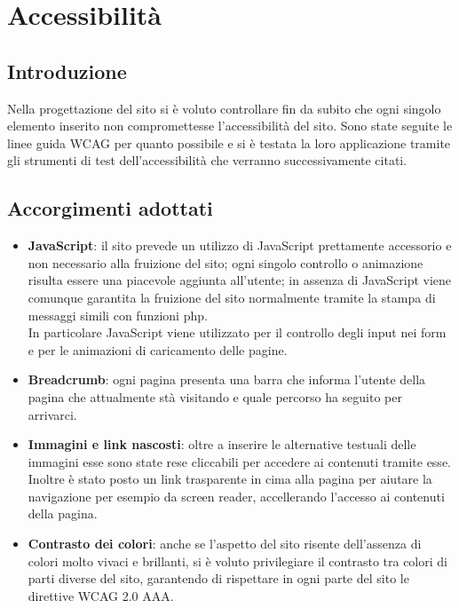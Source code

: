 \documentclass[a4paper,12pt]{article}
\begin{document}
\section{Accessibilità}
\subsection{Introduzione}
Nella progettazione del sito si è voluto controllare fin da subito che ogni singolo elemento inserito non compromettesse l'accessibilità del sito. Sono state seguite le linee guida WCAG per quanto possibile e si è testata la loro applicazione tramite gli strumenti di test dell'accessibilità che verranno successivamente citati.
\subsection{Accorgimenti adottati}
\begin{itemize}
	\item \textbf{JavaScript}: il sito prevede un utilizzo di JavaScript prettamente accessorio e non necessario alla fruizione del sito; ogni singolo controllo o animazione risulta essere una piacevole aggiunta all'utente; in assenza di JavaScript viene comunque garantita la fruizione del sito normalmente tramite la stampa di messaggi simili con funzioni php.\\
	In particolare JavaScript viene utilizzato per il controllo degli input nei form e per le animazioni di caricamento delle pagine.
	
	\item \textbf{Breadcrumb}: ogni pagina presenta una barra che informa l'utente della pagina che attualmente stà visitando e quale percorso ha seguito per arrivarci.
	
	\item \textbf{Immagini e link nascosti}: oltre a inserire le alternative testuali delle immagini esse sono state rese cliccabili per accedere ai contenuti tramite esse.\\
	Inoltre è stato posto un link trasparente in cima alla pagina per aiutare la navigazione per esempio da screen reader, accellerando l'accesso ai contenuti della pagina.
	
	\item \textbf{Contrasto dei colori}: anche se l'aspetto del sito risente dell'assenza di colori molto vivaci e brillanti, si è voluto privilegiare il contrasto tra colori di parti diverse del sito, garantendo di rispettare in ogni parte del sito le direttive WCAG 2.0 AAA.
\end{itemize}
\end{document}
